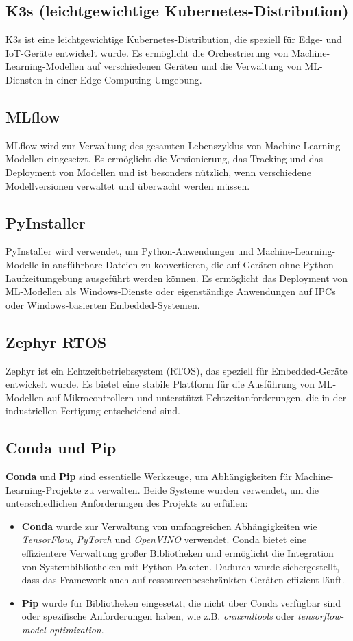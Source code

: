 \subsection{K3s (leichtgewichtige Kubernetes-Distribution)}
K3s ist eine leichtgewichtige Kubernetes-Distribution, die speziell für Edge- und IoT-Geräte entwickelt wurde. Es ermöglicht die Orchestrierung von 
Machine-Learning-Modellen auf verschiedenen Geräten und die Verwaltung von ML-Diensten in einer Edge-Computing-Umgebung.

\subsection{MLflow}
MLflow wird zur Verwaltung des gesamten Lebenszyklus von Machine-Learning-Modellen eingesetzt. Es ermöglicht die Versionierung, das Tracking und das 
Deployment von Modellen und ist besonders nützlich, wenn verschiedene Modellversionen verwaltet und überwacht werden müssen.

\subsection{PyInstaller}
PyInstaller wird verwendet, um Python-Anwendungen und Machine-Learning-Modelle in ausführbare Dateien zu konvertieren, die auf Geräten ohne 
Python-Laufzeitumgebung ausgeführt werden können. Es ermöglicht das Deployment von ML-Modellen als Windows-Dienste oder eigenständige Anwendungen 
auf IPCs oder Windows-basierten Embedded-Systemen.

\subsection{Zephyr RTOS}
Zephyr ist ein Echtzeitbetriebssystem (RTOS), das speziell für Embedded-Geräte entwickelt wurde. Es bietet eine stabile Plattform für die Ausführung 
von ML-Modellen auf Mikrocontrollern und unterstützt Echtzeitanforderungen, die in der industriellen Fertigung entscheidend sind.

\subsection{Conda und Pip}
\textbf{Conda} und \textbf{Pip} sind essentielle Werkzeuge, um Abhängigkeiten für Machine-Learning-Projekte zu verwalten. Beide Systeme wurden verwendet, 
um die unterschiedlichen Anforderungen des Projekts zu erfüllen:
\begin{itemize}
    \item \textbf{Conda} wurde zur Verwaltung von umfangreichen Abhängigkeiten wie \textit{TensorFlow}, \textit{PyTorch} und \textit{OpenVINO} verwendet. 
    Conda bietet eine effizientere Verwaltung großer Bibliotheken und ermöglicht die Integration von Systembibliotheken mit Python-Paketen. Dadurch wurde 
    sichergestellt, dass das Framework auch auf ressourcenbeschränkten Geräten effizient läuft.
    \item \textbf{Pip} wurde für Bibliotheken eingesetzt, die nicht über Conda verfügbar sind oder spezifische Anforderungen haben, wie z.B. \textit{onnxmltools} 
    oder \textit{tensorflow-model-optimization}.
\end{itemize}

